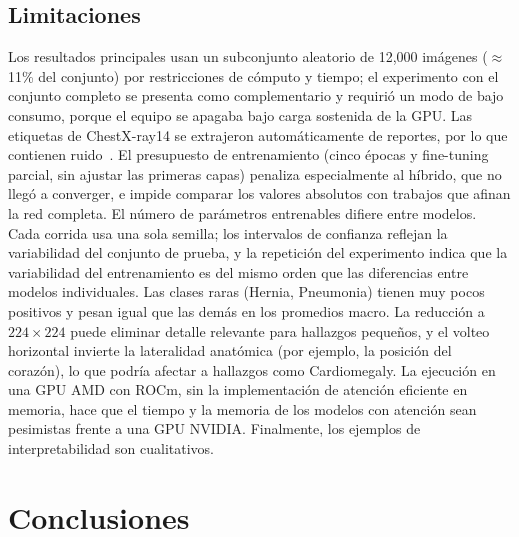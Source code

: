 \documentclass[conference]{IEEEtran}
\begin{document}
\subsection{Limitaciones}
Los resultados principales usan un subconjunto aleatorio de 12{,}000 imágenes ($\approx$11\% del conjunto) por restricciones de cómputo y tiempo; el experimento con el conjunto completo se presenta como complementario y requirió un modo de bajo consumo, porque el equipo se apagaba bajo carga sostenida de la GPU. Las etiquetas de ChestX-ray14 se extrajeron automáticamente de reportes, por lo que contienen ruido~\cite{oakdenrayner2020exploring}. El presupuesto de entrenamiento (cinco épocas y fine-tuning parcial, sin ajustar las primeras capas) penaliza especialmente al híbrido, que no llegó a converger, e impide comparar los valores absolutos con trabajos que afinan la red completa. El número de parámetros entrenables difiere entre modelos. Cada corrida usa una sola semilla; los intervalos de confianza reflejan la variabilidad del conjunto de prueba, y la repetición del experimento indica que la variabilidad del entrenamiento es del mismo orden que las diferencias entre modelos individuales. Las clases raras (Hernia, Pneumonia) tienen muy pocos positivos y pesan igual que las demás en los promedios macro. La reducción a $224\times224$ puede eliminar detalle relevante para hallazgos pequeños, y el volteo horizontal invierte la lateralidad anatómica (por ejemplo, la posición del corazón), lo que podría afectar a hallazgos como Cardiomegaly. La ejecución en una GPU AMD con ROCm, sin la implementación de atención eficiente en memoria, hace que el tiempo y la memoria de los modelos con atención sean pesimistas frente a una GPU NVIDIA. Finalmente, los ejemplos de interpretabilidad son cualitativos.

\section{Conclusiones}
\end{document}
